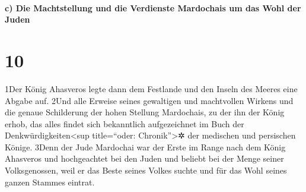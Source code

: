 \hypertarget{c-die-machtstellung-und-die-verdienste-mardochais-um-das-wohl-der-juden}{%
\paragraph{c) Die Machtstellung und die Verdienste Mardochais um das
Wohl der
Juden}\label{c-die-machtstellung-und-die-verdienste-mardochais-um-das-wohl-der-juden}}

\hypertarget{section-9}{%
\section{10}\label{section-9}}

1Der König Ahasveros legte dann dem Festlande und den Inseln des Meeres
eine Abgabe auf. 2Und alle Erweise seines gewaltigen und machtvollen
Wirkens und die genaue Schilderung der hohen Stellung Mardochais, zu der
ihn der König erhob, das alles findet sich bekanntlich aufgezeichnet im
Buch der Denkwürdigkeiten\textless sup title=``oder:
Chronik''\textgreater✲ der medischen und persischen Könige. 3Denn der
Jude Mardochai war der Erste im Range nach dem König Ahasveros und
hochgeachtet bei den Juden und beliebt bei der Menge seiner
Volksgenossen, weil er das Beste seines Volkes suchte und für das Wohl
seines ganzen Stammes eintrat.
